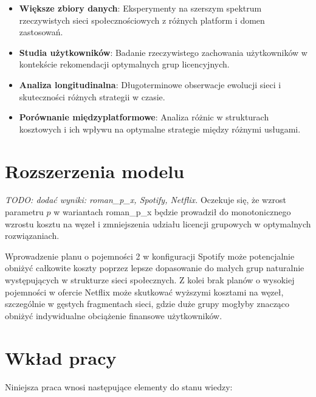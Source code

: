 \begin{itemize}
\item \textbf{Większe zbiory danych}: Eksperymenty na szerszym spektrum rzeczywistych sieci społecznościowych z różnych platform i domen zastosowań.

\item \textbf{Studia użytkowników}: Badanie rzeczywistego zachowania użytkowników w kontekście rekomendacji optymalnych grup licencyjnych.

\item \textbf{Analiza longitudinalna}: Długoterminowe obserwacje ewolucji sieci i skuteczności różnych strategii w czasie.

\item \textbf{Porównanie międzyplatformowe}: Analiza różnic w strukturach kosztowych i ich wpływu na optymalne strategie między różnymi usługami.
\end{itemize}

\section{Rozszerzenia modelu}

\emph{TODO: dodać wyniki: roman\_p\_x, Spotify, Netflix.} Oczekuje się, że wzrost parametru $p$ w wariantach roman\_p\_x będzie prowadził do monotonicznego wzrostu kosztu na węzeł i zmniejszenia udziału licencji grupowych w optymalnych rozwiązaniach.

Wprowadzenie planu o pojemności 2 w konfiguracji Spotify może potencjalnie obniżyć całkowite koszty poprzez lepsze dopasowanie do małych grup naturalnie występujących w strukturze sieci społecznych. Z kolei brak planów o wysokiej pojemności w ofercie Netflix może skutkować wyższymi kosztami na węzeł, szczególnie w gęstych fragmentach sieci, gdzie duże grupy mogłyby znacząco obniżyć indywidualne obciążenie finansowe użytkowników.

\section{Wkład pracy}

Niniejsza praca wnosi następujące elementy do stanu wiedzy:

